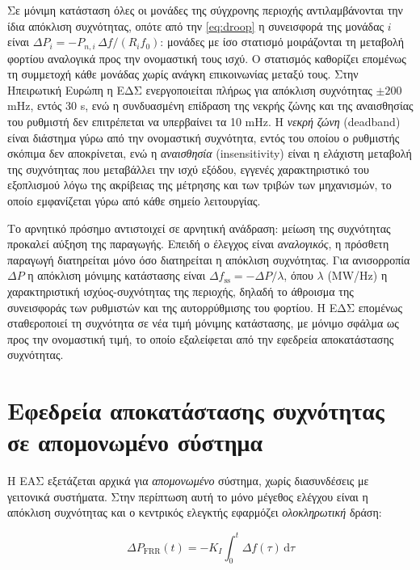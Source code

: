 Σε μόνιμη κατάσταση όλες οι μονάδες της σύγχρονης περιοχής αντιλαμβάνονται την ίδια
απόκλιση συχνότητας, οπότε από την \eqref{eq:droop} η συνεισφορά της μονάδας $i$ είναι
$\Delta P_i = -P_{n,i}\,\Delta f / (R_i f_0)$: μονάδες με ίσο στατισμό μοιράζονται τη
μεταβολή φορτίου αναλογικά προς την ονομαστική τους ισχύ. Ο στατισμός καθορίζει επομένως τη
συμμετοχή κάθε μονάδας χωρίς ανάγκη επικοινωνίας μεταξύ τους. Στην Ηπειρωτική Ευρώπη η ΕΔΣ
ενεργοποιείται πλήρως για απόκλιση συχνότητας $\pm 200$ mHz, εντός 30 s, ενώ η συνδυασμένη
επίδραση της νεκρής ζώνης και της αναισθησίας του ρυθμιστή δεν επιτρέπεται να υπερβαίνει τα
10 mHz. Η \emph{νεκρή ζώνη} (deadband) είναι διάστημα γύρω από την ονομαστική συχνότητα, εντός
του οποίου ο ρυθμιστής σκόπιμα δεν αποκρίνεται, ενώ η \emph{αναισθησία} (insensitivity) είναι η
ελάχιστη μεταβολή της συχνότητας που μεταβάλλει την ισχύ εξόδου, εγγενές χαρακτηριστικό του
εξοπλισμού λόγω της ακρίβειας της μέτρησης και των τριβών των μηχανισμών, το οποίο εμφανίζεται
γύρω από κάθε σημείο λειτουργίας.

Το αρνητικό πρόσημο αντιστοιχεί σε αρνητική ανάδραση: μείωση της συχνότητας προκαλεί αύξηση
της παραγωγής. Επειδή ο έλεγχος είναι \emph{αναλογικός}, η πρόσθετη παραγωγή διατηρείται μόνο
όσο διατηρείται η απόκλιση συχνότητας. Για ανισορροπία $\Delta P$ η απόκλιση μόνιμης
κατάστασης είναι $\Delta f_{\mathrm{ss}} = -\Delta P / \lambda$, όπου $\lambda$ (MW/Hz) η
χαρακτηριστική ισχύος-συχνότητας της περιοχής, δηλαδή το άθροισμα της συνεισφοράς των
ρυθμιστών και της αυτορρύθμισης του φορτίου. Η ΕΔΣ επομένως σταθεροποιεί τη συχνότητα σε
νέα τιμή μόνιμης κατάστασης, με μόνιμο σφάλμα ως προς την ονομαστική τιμή, το οποίο
εξαλείφεται από την εφεδρεία αποκατάστασης συχνότητας.

\section{Εφεδρεία αποκατάστασης συχνότητας σε απομονωμένο σύστημα}
\label{sec:frr-single}

Η ΕΑΣ εξετάζεται αρχικά για \emph{απομονωμένο} σύστημα, χωρίς διασυνδέσεις με γειτονικά
συστήματα. Στην περίπτωση αυτή το μόνο μέγεθος ελέγχου είναι η απόκλιση συχνότητας και ο
κεντρικός ελεγκτής εφαρμόζει \emph{ολοκληρωτική} δράση:

\begin{equation}
\Delta P_{\mathrm{FRR}}(t) = -K_I \int_0^{t} \Delta f(\tau)\,\mathrm{d}\tau
\label{eq:frr-isolated}
\end{equation}

